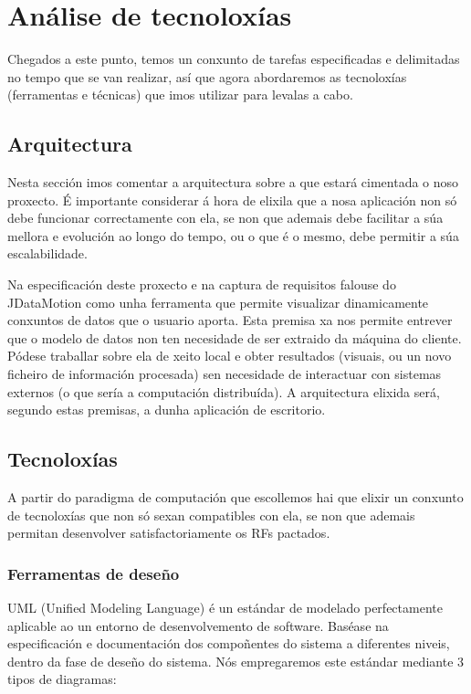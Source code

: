 \section{Análise de tecnoloxías}

Chegados a este punto, temos un conxunto de tarefas especificadas e delimitadas no tempo que se van realizar, así que agora abordaremos as tecnoloxías (ferramentas e técnicas) que imos utilizar para levalas a cabo.

\subsection{Arquitectura}

Nesta sección imos comentar a arquitectura sobre a que estará cimentada o noso proxecto. É importante considerar á hora de elixila que a nosa aplicación non só debe funcionar correctamente con ela, se non que ademais debe facilitar a súa mellora e evolución ao longo do tempo, ou o que é o mesmo, debe permitir a súa escalabilidade.

Na especificación deste proxecto e na captura de requisitos falouse do JDataMotion como unha ferramenta que permite visualizar dinamicamente conxuntos de datos que o usuario aporta. Esta premisa xa nos permite entrever que o modelo de datos non ten necesidade de ser extraido da máquina do cliente. Pódese traballar sobre ela de xeito local e obter resultados (visuais, ou un novo ficheiro de información procesada) sen necesidade de interactuar con sistemas externos (o que sería a computación distribuída). A arquitectura elixida será, segundo estas premisas, a dunha aplicación de escritorio.

\subsection{Tecnoloxías}

A partir do paradigma de computación que escollemos hai que elixir un conxunto de tecnoloxías que non só sexan compatibles con ela, se non que ademais permitan desenvolver satisfactoriamente os RFs pactados.

\subsubsection{Ferramentas de deseño}


UML (Unified Modeling Language) é un estándar de modelado perfectamente aplicable ao un entorno de desenvolvemento de software. Baséase na especificación e documentación dos compoñentes do sistema a diferentes niveis, dentro da fase de deseño do sistema. Nós empregaremos este estándar mediante 3 tipos de diagramas:


